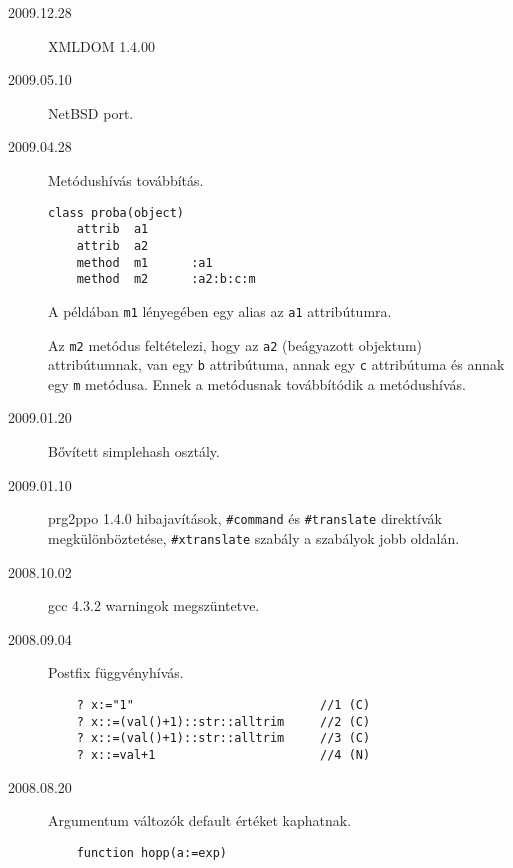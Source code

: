 
\begin{description}

\item[2009.12.28]
  XMLDOM  1.4.00\par

\item[2009.05.10]
  NetBSD port.\par

\item[2009.04.28]
  Metódushívás továbbítás.\par

\begin{verbatim}
class proba(object)
    attrib  a1
    attrib  a2
    method  m1      :a1
    method  m2      :a2:b:c:m
\end{verbatim}

A példában \verb!m1! lényegében egy alias az \verb!a1! attribútumra.

Az \verb!m2! metódus feltételezi, hogy az \verb!a2! (beágyazott objektum) 
attribútumnak, van egy \verb!b! attribútuma, annak egy \verb!c! attribútuma 
és annak egy \verb!m! metódusa. Ennek a metódusnak továbbítódik a metódushívás.


\item[2009.01.20]
  Bővített simplehash osztály.\par

\item[2009.01.10]
  prg2ppo 1.4.0 
    hibajavítások,
    \verb!#command! és \verb!#translate! direktívák megkülönböztetése,
    \verb!#xtranslate! szabály a szabályok jobb oldalán.\par

\item[2008.10.02]
  gcc 4.3.2 warningok megszüntetve.\par

\item[2008.09.04]
   Postfix függvényhívás.
\begin{verbatim}
    ? x:="1"                          //1 (C)
    ? x::=(val()+1)::str::alltrim     //2 (C)
    ? x::=(val()+1)::str::alltrim     //3 (C)
    ? x::=val+1                       //4 (N)
\end{verbatim}

\item[2008.08.20]
  Argumentum változók default értéket kaphatnak.

\begin{verbatim}
    function hopp(a:=exp)
\end{verbatim}


\end{description}

